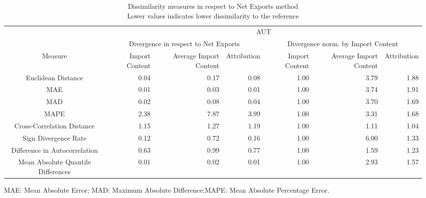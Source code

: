 \begin{table}[t]
\caption*{
{\large Dissimilarity measures in respect to Net Exports method} \\ 
{\small Lower values indicates lower dissimilarity to the reference}
} 
\fontsize{15.0pt}{18.0pt}\selectfont
\begin{tabular*}{\linewidth}{@{\extracolsep{\fill}}crrrrrr}
\toprule
 & \multicolumn{6}{c}{AUT} \\ 
\cmidrule(lr){2-7}
 & \multicolumn{3}{c}{Divergence in respect to Net Exports} & \multicolumn{3}{c}{Divergence norm. by Import Content} \\ 
\cmidrule(lr){2-4} \cmidrule(lr){5-7}
Measure & Import Content & Average Import Content & Attribution & Import Content & Average Import Content & Attribution \\ 
\midrule\addlinespace[2.5pt]
Euclidean Distance & 0.04 & 0.17 & 0.08 & 1.00 & 3.79 & 1.88 \\ 
MAE & 0.01 & 0.03 & 0.01 & 1.00 & 3.74 & 1.91 \\ 
MAD & 0.02 & 0.08 & 0.04 & 1.00 & 3.70 & 1.69 \\ 
MAPE & 2.38 & 7.87 & 3.99 & 1.00 & 3.31 & 1.68 \\ 
Cross-Correlation Distance & 1.15 & 1.27 & 1.19 & 1.00 & 1.11 & 1.04 \\ 
Sign Divergence Rate & 0.12 & 0.72 & 0.16 & 1.00 & 6.00 & 1.33 \\ 
Difference in Autocorrelation & 0.63 & 0.99 & 0.77 & 1.00 & 1.59 & 1.23 \\ 
Mean Absolute Quantile Differences & 0.01 & 0.02 & 0.01 & 1.00 & 2.93 & 1.57 \\ 
\bottomrule
\end{tabular*}
\begin{minipage}{\linewidth}
MAE: Mean Absolute Error; MAD: Maximum Absolute Difference;MAPE: Mean Absolute Percentage Error.\\
\end{minipage}
\end{table}

